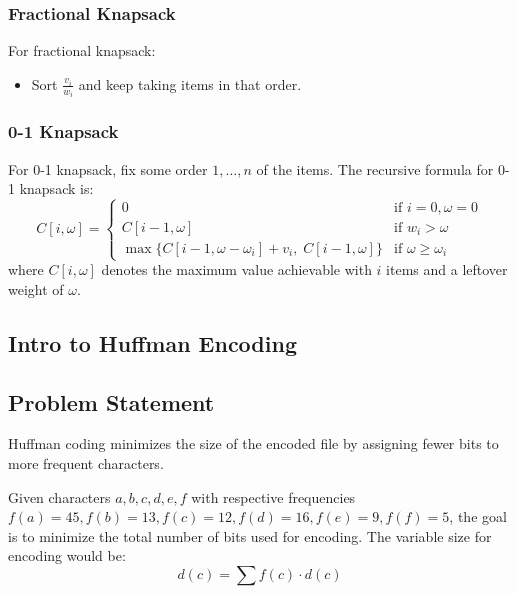 \subsubsection{Fractional Knapsack}
\begin{definition}
For fractional knapsack:
\begin{itemize}
    \item Sort $\frac{v_i}{w_i}$ and keep taking items in that order.
\end{itemize}
\end{definition}

\subsubsection{0-1 Knapsack}
\begin{definition}
    For 0-1 knapsack, fix some order $1, \dots, n$ of the items. The recursive formula for 0-1 knapsack is:
    \[
    C[i, \omega] = \begin{cases} 
        0 & \text{if } i = 0, \omega = 0 \\
        C[i-1, \omega] & \text{if } w_i > \omega \\
        \max \{C[i-1, \omega - \omega_i] + v_i, \; C[i-1, \omega]\} & \text{if } \omega \geq \omega_i 
    \end{cases}
    \]
    where $C[i, \omega]$ denotes the maximum value achievable with $i$ items and a leftover weight of $\omega$.
\end{definition}

\subsection{Intro to Huffman Encoding}

\subsection{Problem Statement}
\begin{intuition}
Huffman coding minimizes the size of the encoded file by assigning fewer bits to more frequent characters.
\end{intuition}

\begin{example}
Given characters $a, b, c, d, e, f$ with respective frequencies $f(a) = 45, f(b) = 13, f(c) = 12, f(d) = 16, f(e) = 9, f(f) = 5$, the goal is to minimize the total number of bits used for encoding. The variable size for encoding would be:
\[
d(c) = \sum f(c) \cdot d(c)
\]
\end{example}

